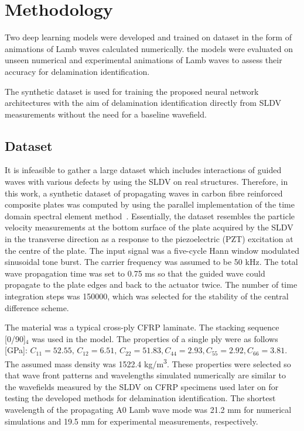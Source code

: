 \section{Methodology}
\begin{sloppypar}
	Two deep learning models were developed and trained on dataset in the form 
	of animations of Lamb waves calculated numerically. \DIFdelbegin {}\DIFdelend \DIFaddbegin {}\DIFaddend the models were 
	evaluated on unseen numerical and experimental animations of Lamb waves to 
	assess their accuracy for delamination identification.

	The synthetic dataset is used for training the proposed neural network architectures with the aim of delamination identification directly from SLDV measurements without the need for a baseline wavefield.
	\subsection{Dataset}
	It is infeasible to gather a large dataset which includes interactions of guided waves with various defects by using the SLDV on real structures. 
	Therefore, in this work, a synthetic dataset of propagating waves in carbon fibre reinforced composite plates was computed by using the parallel implementation of the time domain spectral element method~\cite{Kudela2020}. 
	Essentially, the dataset resembles the particle velocity measurements at the bottom surface of the plate acquired by the SLDV in the transverse direction as a response to the piezoelectric (PZT) excitation at the centre of the plate. 
	The input signal was a five-cycle Hann window modulated sinusoidal tone burst. The carrier frequency was assumed to be 50 kHz. 
	The total wave propagation time was set to 0.75 ms so that the guided wave could propagate to the plate edges and back to the actuator twice.
	The number of time integration steps was 150000, which was selected for the stability of the central difference scheme.

	The material was a typical cross-ply CFRP laminate. 
	The stacking sequence [0/90]\(_4\) was used in the model. 
	The properties of a single ply were as follows [GPa]:
	\(C_{11} = 52.55, \, C_{12} = 6.51, \, C_{22} = 51.83, C_{44} = 2.93, C_{55} = 2.92, C_{66} = 3.81\). 
	The assumed mass density was 1522.4 kg/m\textsuperscript{3}.
	These properties were selected so that wave front patterns and wavelengths simulated numerically are similar to the wavefields measured by the SLDV on CFRP specimens used later on for testing the developed methods for delamination identification.
	The shortest wavelength of the propagating A0 Lamb wave mode was 21.2 mm for numerical simulations and 19.5 mm for experimental measurements, respectively.


\end{sloppypar}
